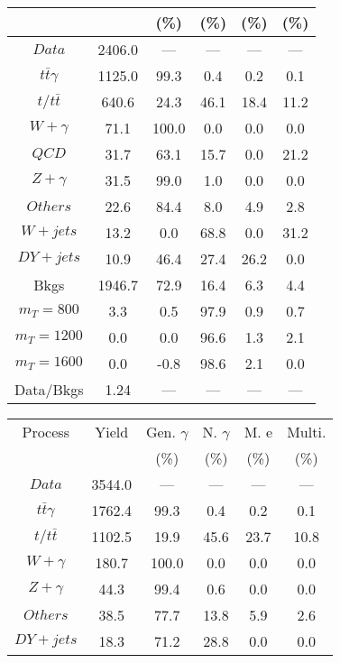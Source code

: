\begin{figure}
\begin{minipage}[c]{0.32\textwidth}
{\begin{tabular}{cccccc}
 &  & (\%) & (\%) & (\%) & (\%)  \\
\hline
                                                                      $ Data $ &  2406.0 &  --- &  --- &  --- &  ---\\
$ t\bar{t}\gamma $ &  1125.0 &  99.3 &  0.4 &  0.2 &  0.1\\
$ t/t\bar{t} $ &  640.6 &  24.3 &  46.1 &  18.4 &  11.2\\
$ W+\gamma $ &  71.1 &  100.0 &  0.0 &  0.0 &  0.0\\
$ QCD $ &  31.7 &  63.1 &  15.7 &  0.0 &  21.2\\
$ Z+\gamma $ &  31.5 &  99.0 &  1.0 &  0.0 &  0.0\\
$ Others $ &  22.6 &  84.4 &  8.0 &  4.9 &  2.8\\
$ W+jets $ &  13.2 &  0.0 &  68.8 &  0.0 &  31.2\\
$ DY+jets $ &  10.9 &  46.4 &  27.4 &  26.2 &  0.0\\
Bkgs &  1946.7 &  72.9 &  16.4 &  6.3 &  4.4\\
$ m_{T} = 800 $ &  3.3 &  0.5 &  97.9 &  0.9 &  0.7\\
$ m_{T} = 1200 $ &  0.0 &  0.0 &  96.6 &  1.3 &  2.1\\
$ m_{T} = 1600 $ &  0.0 &  -0.8 &  98.6 &  2.1 &  0.0\\
Data/Bkgs &  1.24 &  --- &  --- &  --- &  ---\\
\hline
\end{tabular}
}
\end{minipage}
\begin{minipage}[c]{0.32\textwidth}
\centering
\tiny{
\begin{tabular}{cccccc}
\hline
Process & Yield & Gen. $\gamma$ & N. $\gamma$ & M. e & Multi. \\
 &  & (\%) & (\%) & (\%) & (\%)  \\
\hline
                                                                      $ Data $ &  3544.0 &  --- &  --- &  --- &  ---\\
$ t\bar{t}\gamma $ &  1762.4 &  99.3 &  0.4 &  0.2 &  0.1\\
$ t/t\bar{t} $ &  1102.5 &  19.9 &  45.6 &  23.7 &  10.8\\
$ W+\gamma $ &  180.7 &  100.0 &  0.0 &  0.0 &  0.0\\
$ Z+\gamma $ &  44.3 &  99.4 &  0.6 &  0.0 &  0.0\\
$ Others $ &  38.5 &  77.7 &  13.8 &  5.9 &  2.6\\
$ DY+jets $ &  18.3 &  71.2 &  28.8 &  0.0 &  0.0\\

\end{tabular}}
\end{minipage}
\end{figure}
